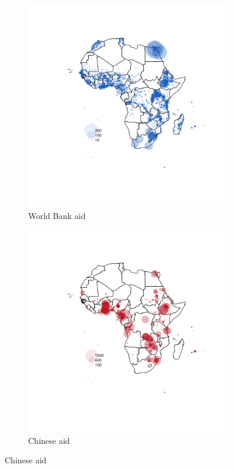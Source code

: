 \documentclass[11pt, oneside]{article}   	%
\begin{document}
\begin{figure}[!ph]
\centering
\caption{Spatial distribution of development aid projects to African nations}

\begin{subfigure}[c]{0.48\textwidth}
\includegraphics[width=\textwidth,trim={15cm 16cm 10cm 8cm},clip]{../../Analysis/output/other_maps/aid_wb.png}
\caption{World Bank aid}
\label{fig:WB_aid_map}
\end{subfigure}
\begin{subfigure}[c]{0.48\textwidth}
\includegraphics[width=\textwidth,trim={15cm 16cm 10cm 8cm},clip]{../../Analysis/output/other_maps/aid_China.png}
\caption{Chinese aid}
\label{fig:China_aid_map}
\end{subfigure}


\end{figure}
\end{document}
